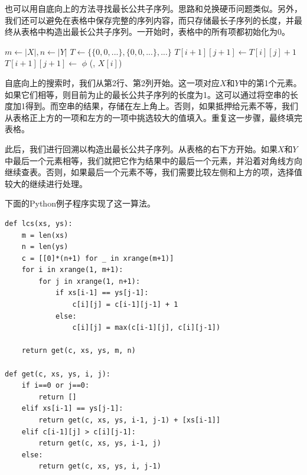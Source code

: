 \documentclass[UTF8]{article}
\begin{document}
也可以用自底向上的方法寻找最长公共子序列。思路和兑换硬币问题类似。另外，我们还可以避免在表格中保存完整的序列内容，而只存储最长子序列的长度，并最终从表格中构造出最长公共子序列。一开始时，表格中的所有项都初始化为0。

\begin{algorithmic}[1]
  \State $m \gets |X|, n \gets |Y|$
  \State $T \gets \{\{0, 0, ...\}, \{0, 0, ...\}, ...\}$ 
        \State $T[i+1][j+1] \gets T[i][j] + 1$
      \Else
        \State $T[i+1][j+1] \gets$ 
      \EndIf
    \EndFor
  \EndFor
  \State \Return {}
\EndFunction
\Statex
{}
    \State \Return $\phi$
    \State \Return {}(, $X[i]$)
    \State \Return {}
  \Else
    \State \Return {}
  \EndIf
\EndFunction
\end{algorithmic}

自底向上的搜索时，我们从第2行、第2列开始。这一项对应$X$和$Y$中的第1个元素。如果它们相等，则目前为止的最长公共子序列的长度为1。这可以通过将空串的长度加1得到。而空串的结果，存储在左上角上。否则，如果抵押给元素不等，我们从表格正上方的一项和左方的一项中挑选较大的值填入。重复这一步骤，最终填完表格。

此后，我们进行回溯以构造出最长公共子序列。从表格的右下方开始。如果$X$和$Y$中最后一个元素相等，我们就把它作为结果中的最后一个元素，并沿着对角线方向继续查表。否则，如果最后一个元素不等，我们需要比较左侧和上方的项，选择值较大的继续进行处理。

下面的Python例子程序实现了这一算法。

\lstset{language=Python}
\begin{lstlisting}
def lcs(xs, ys):
    m = len(xs)
    n = len(ys)
    c = [[0]*(n+1) for _ in xrange(m+1)]
    for i in xrange(1, m+1):
        for j in xrange(1, n+1):
            if xs[i-1] == ys[j-1]:
                c[i][j] = c[i-1][j-1] + 1
            else:
                c[i][j] = max(c[i-1][j], c[i][j-1])

    return get(c, xs, ys, m, n)

def get(c, xs, ys, i, j):
    if i==0 or j==0:
        return []
    elif xs[i-1] == ys[j-1]:
        return get(c, xs, ys, i-1, j-1) + [xs[i-1]]
    elif c[i-1][j] > c[i][j-1]:
        return get(c, xs, ys, i-1, j)
    else:
        return get(c, xs, ys, i, j-1)
\end{lstlisting}
\end{document}

